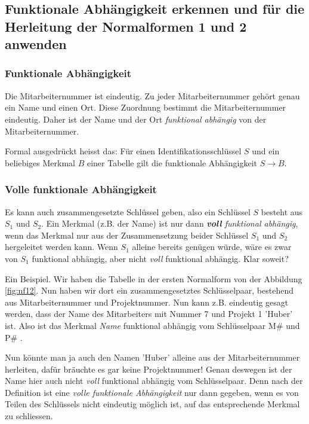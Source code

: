 \subsection{Funktionale Abhängigkeit erkennen und für die Herleitung der Normalformen 1 und 2 anwenden}

\subsubsection{Funktionale Abhängigkeit}
Die Mitarbeiternummer ist eindeutig. Zu jeder Mitarbeiternummer gehört genau ein Name und einen Ort. Diese Zuordnung bestimmt die Mitarbeiternummer eindeutig. Daher ist der Name und der Ort \emph{funktional abhängig} von der Mitarbeiternummer.

Formal ausgedrückt heisst das: Für einen Identifikationsschlüssel \(S\) und ein beliebiges Merkmal \(B\) einer Tabelle gilt die funktionale Abhängigkeit \(S \rightarrow B\).

\subsubsection{Volle funktionale Abhängigkeit}
Es kann auch zusammengesetzte Schlüssel geben, also ein Schlüssel \(S\) besteht aus \(S_{1}\) und \(S_{2}\). Ein Merkmal (z.B. der Name) ist nur dann \emph{\textbf{voll} funktional  abhängig}, wenn das Merkmal nur aus der Zusammensetzung beider Schlüssel \(S_{1}\) und \(S_{2}\) hergeleitet werden kann. Wenn \(S_{1}\) alleine bereits genügen würde, wäre es zwar von \(S_{1}\) funktional abhängig, aber nicht \emph{voll} funktional abhängig. Klar soweit?


Ein Beispiel. Wir haben die Tabelle in der ersten Normalform von der Abbildung \ref{fig:nf12}. Nun haben wir dort ein zusammengesetztes Schlüsselpaar, bestehend aus Mitarbeiternummer und Projektnummer. Nun kann z.B. eindeutig gesagt werden, dass der Name des Mitarbeiters mit Nummer 7 und Projekt 1 'Huber' ist. Also ist das Merkmal \emph{Name} funktional abhängig vom Schlüsselpaar M\# und P\# .

Nun könnte man ja auch den Namen 'Huber' alleine aus der Mitarbeiternummer herleiten, dafür bräuchte es gar keine Projektnummer! Genau deswegen ist der Name hier auch nicht \emph{voll} funktional abhängig vom Schlüsselpaar. Denn nach der Definition ist eine \emph{volle funktionale Abhängigkeit} nur dann gegeben, wenn es von Teilen des Schlüssels nicht eindeutig möglich ist, auf das entsprechende Merkmal zu schliessen.

